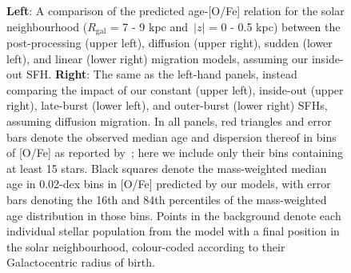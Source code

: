 {\begin{landscape}
\begin{figure}
\caption{
\textbf{Left}: A comparison of the predicted age-[O/Fe] relation for the solar 
neighbourhood ($R_\text{gal}$ = 7 - 9 kpc and~$\left|z\right|$ = 0 - 0.5 kpc) 
between the post-processing (upper left), diffusion (upper right), sudden 
(lower left), and linear (lower right) migration models, assuming our 
inside-out SFH. 
\textbf{Right}: The same as the left-hand panels, instead comparing the impact 
of our constant (upper left), inside-out (upper right), late-burst (lower left), 
and outer-burst (lower right) SFHs, assuming diffusion migration. In all panels, 
red triangles and error bars denote the observed median age and dispersion 
thereof in bins of [O/Fe] as reported by~\citet{Feuillet2019}; here we include 
only their bins containing at least 15 stars. Black squares denote the 
mass-weighted median age in 0.02-dex bins in [O/Fe] predicted by our models, 
with error bars denoting the 16th and 84th percentiles of the mass-weighted 
age distribution in those bins. Points in the background denote each individual 
stellar population from the model with a final position in the solar 
neighbourhood, colour-coded according to their Galactocentric radius of birth. 
}
\label{migration:fig:age_alpha} 
\end{figure} 
\end{landscape}
\clearpage
}

